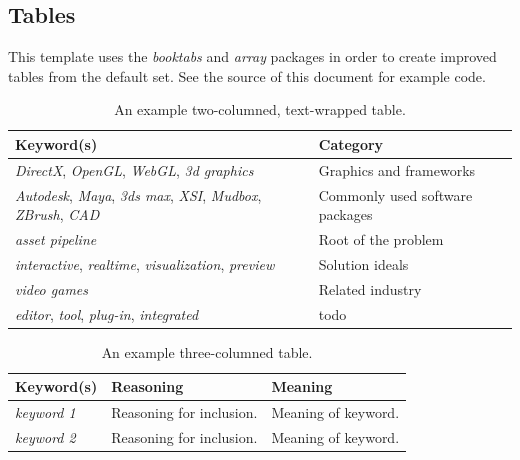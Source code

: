 \subsection{Tables}
This template uses the \textit{booktabs} and \textit{array} packages in order to create improved tables from the default set.  See the source of this document for example code.

\begin{table}[H]
	\centering
		\begin{tabular}{p{6.5cm} p{7cm}} \toprule
			\multicolumn{1}{m{2cm}}{\centering Keyword(s)} & \multicolumn{1}{m{0cm}}{\centering Category}\\
			\midrule
			\textit{DirectX}, \textit{OpenGL}, \textit{WebGL}, \textit{3d graphics} & Graphics and frameworks\\
			\textit{Autodesk}, \textit{Maya}, \textit{3ds max}, \textit{XSI}, \textit{Mudbox}, \textit{ZBrush}, \textit{CAD} & Commonly used software packages\\
			\textit{asset pipeline} & Root of the problem\\
			\textit{interactive}, \textit{realtime}, \textit{visualization}, \textit{preview} & Solution ideals\\
			\textit{video games} & Related industry\\
			\textit{editor}, \textit{tool}, \textit{plug-in}, \textit{integrated} & todo\\
			\bottomrule
		\end{tabular}
	\caption{An example two-columned, text-wrapped table.}
\end{table}

\begin{table}[H]
			\centering
      \begin{tabular}{l l p{6cm}} \toprule
         \multicolumn{1}{m{1cm}}{\centering Keyword(s)}
         & \multicolumn{1}{m{1cm}}{\centering Reasoning}
         & \multicolumn{1}{m{1cm}}{\centering Meaning} \\
         \midrule
         \textit{keyword 1} & Reasoning for inclusion. & Meaning of keyword.\\
         \textit{keyword 2} & Reasoning for inclusion. & Meaning of keyword.\\
         \bottomrule
      \end{tabular}
      \caption{An example three-columned table.}
\end{table}
